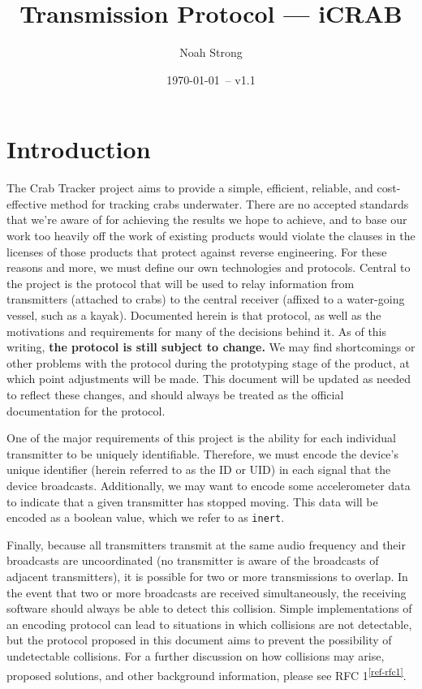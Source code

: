 \documentclass[12pt,hidelinks]{article}
\title{Transmission Protocol --- iCRAB}
\author{
	Noah Strong
}
\date{\today\ -- v1.1}
\newcommand{\fastcite}[1]{\textsuperscript{\ref{#1}}}
\begin{document}
\maketitle

\tableofcontents{}

\newpage

\section{Introduction} \label{introduction}

The Crab Tracker project aims to provide a simple, efficient, reliable, and
cost-effective method for tracking crabs underwater. There are no accepted
standards that we're aware of for achieving the results we hope to achieve,
and to base our work too heavily off the work of existing products would
violate the clauses in the licenses of those products that protect against
reverse engineering.
For these reasons and more, we must define our own technologies and protocols.
Central to the project is the protocol that will be used to relay information
from transmitters (attached to crabs) to the central receiver (affixed to a
water-going vessel, such as a kayak).
Documented herein is that protocol, as well as the motivations and requirements
for many of the decisions behind it.
As of this writing, {\bf the protocol is still subject to change.}
We may find shortcomings or other problems with the protocol during
the prototyping stage of the product, at which point adjustments will be made.
This document will be updated as needed to reflect these changes,
and should always be treated as the official documentation for the protocol.

One of the major requirements of this project is the ability for each
individual transmitter to be uniquely identifiable. Therefore, we must encode
the device's unique identifier (herein referred to as the ID or UID) in each
signal that the device broadcasts.
Additionally, we may want to encode some accelerometer data to indicate that a
given transmitter has stopped moving.
This data will be encoded as a boolean value, which we refer to as
\texttt{inert}.

Finally, because all transmitters transmit at the same audio frequency
and their broadcasts are uncoordinated (no transmitter is aware of the
broadcasts of adjacent transmitters),
it is possible for two or more transmissions to overlap.
In the event that two or more broadcasts are received simultaneously,
the receiving software should always be able to detect this collision.
Simple implementations
of an encoding protocol can lead to situations in which collisions are not
detectable, but the protocol proposed in this document aims to prevent the
possibility of undetectable collisions. For a further discussion on how
collisions may arise, proposed solutions, and other background information,
please see RFC 1\fastcite{ref-rfc1}.
\end{document}
